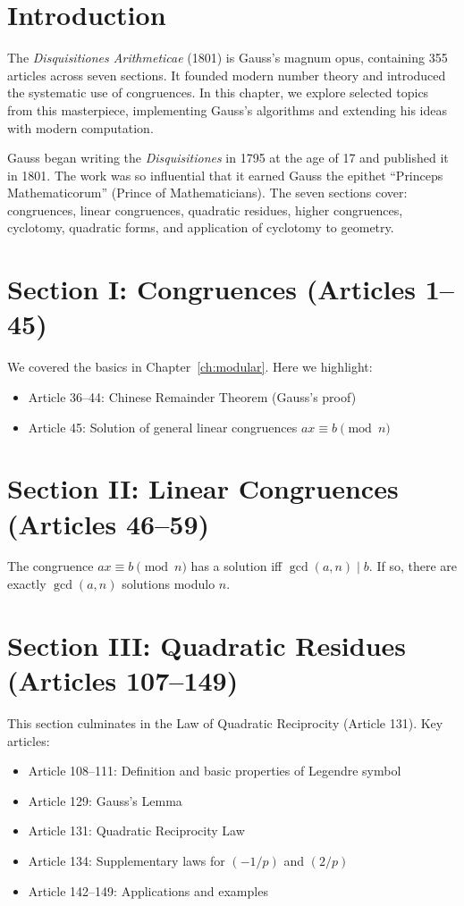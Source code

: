 \section{Introduction}

The \textit{Disquisitiones Arithmeticae} (1801) is Gauss's magnum opus, containing 355 articles across seven sections. It founded modern number theory and introduced the systematic use of congruences. In this chapter, we explore selected topics from this masterpiece, implementing Gauss's algorithms and extending his ideas with modern computation.

Gauss began writing the \textit{Disquisitiones} in 1795 at the age of 17 and published it in 1801. The work was so influential that it earned Gauss the epithet ``Princeps Mathematicorum'' (Prince of Mathematicians). The seven sections cover: congruences, linear congruences, quadratic residues, higher congruences, cyclotomy, quadratic forms, and application of cyclotomy to geometry.

\section{Section I: Congruences (Articles 1--45)}

We covered the basics in Chapter~\ref{ch:modular}. Here we highlight:
\begin{itemize}
    \item Article 36--44: Chinese Remainder Theorem (Gauss's proof)
    \item Article 45: Solution of general linear congruences $ax \equiv b \pmod{n}$
\end{itemize}

\section{Section II: Linear Congruences (Articles 46--59)}

\begin{theorem}[Article 49]
The congruence $ax \equiv b \pmod{n}$ has a solution iff $\gcd(a,n) \mid b$. If so, there are exactly $\gcd(a,n)$ solutions modulo $n$.
\end{theorem}

\section{Section III: Quadratic Residues (Articles 107--149)}

This section culminates in the Law of Quadratic Reciprocity (Article 131). Key articles:
\begin{itemize}
    \item Article 108--111: Definition and basic properties of Legendre symbol
    \item Article 129: Gauss's Lemma
    \item Article 131: Quadratic Reciprocity Law
    \item Article 134: Supplementary laws for $(-1/p)$ and $(2/p)$
    \item Article 142--149: Applications and examples
\end{itemize}

